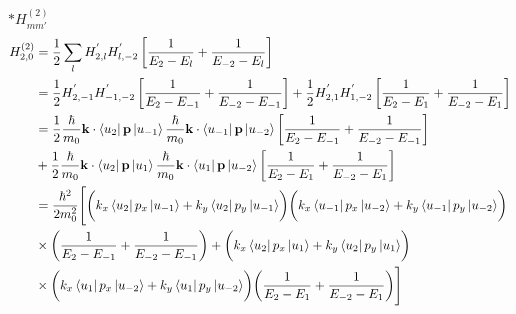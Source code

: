 \documentclass{report}
\newcommand{\f}[2]{\dfrac{#1}{#2}}
\begin{document}
$\ast H^{(2)}_{mm'}$
\begin{align*}
	H_{2,0}^{(2)}
	 & = \f{1}{2} \sum_{l} H_{2,l}^{'}H_{l,-2}^{'}\left[ \f{1}{ E_{2} - E_{l}} + \f{1}{ E_{-2} - E_{l} } \right]                                                                                                      \\
	 & = \f{1}{2} H_{2,-1}^{'}H_{-1,-2}^{'}\left[ \f{1}{ E_{2} - E_{-1}} + \f{1}{ E_{-2} - E_{-1} } \right] + \f{1}{2} H_{2,1}^{'}H_{1,-2}^{'} \left[ \f{1}{ E_{2} - E_{1}} + \f{1}{ E_{-2} - E_{1} } \right]         \\
	 & = \f{1}{2} \f{\hbar}{m_0} \mathbf{k}\cdot \bra{u_{2}}\mathbf{p}\ket{u_{-1}} \f{\hbar}{m_0} \mathbf{k}\cdot \bra{u_{-1}}\mathbf{p}\ket{u_{-2}} \left[ \f{1}{ E_{2} - E_{-1}} + \f{1}{ E_{-2} - E_{-1} } \right] \\
	 & + \f{1}{2} \f{\hbar}{m_0} \mathbf{k}\cdot \bra{u_{2}}\mathbf{p}\ket{u_{1}} \f{\hbar}{m_0} \mathbf{k}\cdot \bra{u_{1}}\mathbf{p}\ket{u_{-2}} \left[ \f{1}{ E_{2} - E_{1}} + \f{1}{ E_{-2} - E_{1} } \right]     \\
	 & = \f{\hbar^2}{2 m_0^2} \Biggl[ \biggl(k_x\bra{u_{2}}p_x\ket{u_{-1}} +  k_y\bra{u_{2}}p_y\ket{u_{-1}}\biggr)\biggl(k_x\bra{u_{-1}}p_x\ket{u_{-2}} +  k_y\bra{u_{-1}}p_y\ket{u_{-2}}\biggr) \\
	 &\times \biggl( \f{1}{ E_{2} - E_{-1}} + \f{1}{ E_{-2} - E_{-1} } \biggr) + \biggl(k_x\bra{u_{2}}p_x\ket{u_{1}} +  k_y\bra{u_{2}}p_y\ket{u_{1}}\biggr)\\
	 &\times \biggl(k_x\bra{u_{1}}p_x\ket{u_{-2}} +  k_y\bra{u_{1}}p_y\ket{u_{-2}}\biggr) \biggl( \f{1}{ E_{2} - E_{1}} + \f{1}{ E_{-2} - E_{1} } \biggr) \Biggr]
\end{align*}
\end{document}
